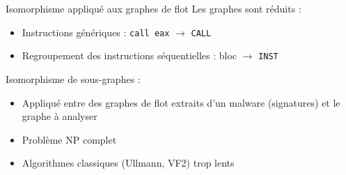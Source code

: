 \documentclass{beamer}
\begin{document}
\begin{frame}{Isomorphisme appliqué aux graphes de flot}
 Les graphes sont réduits :
 \begin{itemize}
  \item Instructions génériques : \texttt{call eax} $\rightarrow$ \texttt{CALL}
  \item Regroupement des instructions séquentielles : bloc $\rightarrow$ \texttt{INST}
 \end{itemize}

 Isomorphisme de sous-graphes :
\begin{itemize}
 \item Appliqué entre des graphes de flot extraits d'un malware (signatures) et le graphe à analyser
 \item Problème NP complet
 \item Algorithmes classiques (Ullmann, VF2) trop lents
\end{itemize}
\end{frame}
\end{document}
